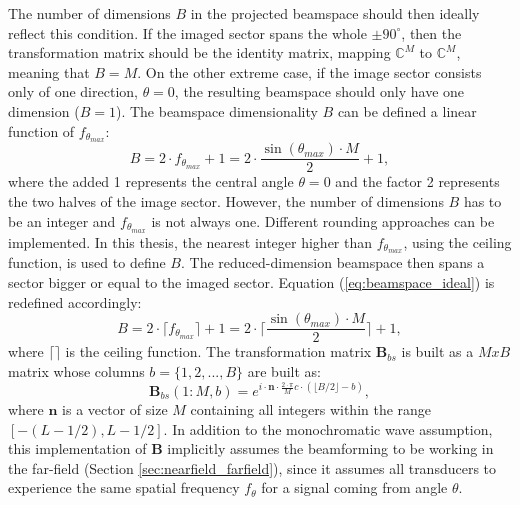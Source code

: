 The number of dimensions $B$ in the projected beamspace should then ideally reflect this condition. If the imaged sector spans the whole $\pm 90^{\circ}$, then the transformation matrix should be the identity matrix, mapping $\mathbb{C}^M$ to $\mathbb{C}^M$, meaning that $B = M$. On the other extreme case, if the image sector consists only of one direction, $\theta = 0$, the resulting beamspace should only have one dimension ($B = 1$). The beamspace dimensionality $B$ can be defined a linear function of $f_{\theta_{max}}$:
\begin{equation}
    B = 2 \cdot f_{\theta_{max}} + 1 = 2 \cdot \frac{\sin(\theta_{max}) \cdot M}{2} + 1,
\label{eq:beamspace_ideal}
\end{equation}
\noindent
where the added 1 represents the central angle $\theta = 0$ and the factor 2 represents the two halves of the image sector. However, the number of dimensions $B$ has to be an integer and $f_{\theta_{max}}$ is not always one. Different rounding approaches can be implemented. In this thesis, the nearest integer higher than $f_{\theta_{max}}$, using the ceiling function, is used to define $B$. The reduced-dimension beamspace then spans a sector bigger or equal to the imaged sector. Equation (\ref{eq:beamspace_ideal}) is redefined accordingly:
\begin{equation}
    B = 2 \cdot \lceil f_{\theta_{max}} \rceil + 1 = 2 \cdot \lceil \frac{\sin(\theta_{max}) \cdot M}{2} \rceil + 1,
\label{eq:beamspace_size}
\end{equation}
\noindent
where $\lceil \rceil$ is the ceiling function.
The transformation matrix $\boldsymbol{B}_{bs}$ is built as a $M x B$ matrix whose columns $b = \{1, 2,..., B \}$ are built as:
\begin{equation}
    \boldsymbol{B}_{bs}(1:M, b) = e^{i \cdot \boldsymbol{n} \cdot \frac{2\cdot \pi}{M} c\cdot (\lfloor B / 2 \rfloor - b)},
\label{eq:beamspace}
\end{equation}
\noindent
where $\boldsymbol{n}$ is a vector of size $M$ containing all integers within the range $[- (L - 1 / 2), L - 1 / 2]$.
In addition to the monochromatic wave assumption, this implementation of $\boldsymbol{B}$ implicitly assumes the beamforming to be working in the far-field (Section \ref{sec:nearfield_farfield}), since it assumes all transducers to experience the same spatial frequency $f_\theta$ for a signal coming from angle $\theta$. 


